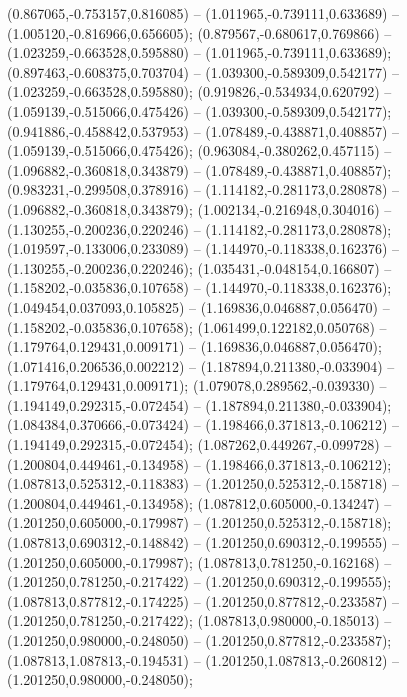  (0.867065,-0.753157,0.816085) -- (1.011965,-0.739111,0.633689) -- (1.005120,-0.816966,0.656605);
 (0.879567,-0.680617,0.769866) -- (1.023259,-0.663528,0.595880) -- (1.011965,-0.739111,0.633689);
 (0.897463,-0.608375,0.703704) -- (1.039300,-0.589309,0.542177) -- (1.023259,-0.663528,0.595880);
 (0.919826,-0.534934,0.620792) -- (1.059139,-0.515066,0.475426) -- (1.039300,-0.589309,0.542177);
 (0.941886,-0.458842,0.537953) -- (1.078489,-0.438871,0.408857) -- (1.059139,-0.515066,0.475426);
 (0.963084,-0.380262,0.457115) -- (1.096882,-0.360818,0.343879) -- (1.078489,-0.438871,0.408857);
 (0.983231,-0.299508,0.378916) -- (1.114182,-0.281173,0.280878) -- (1.096882,-0.360818,0.343879);
 (1.002134,-0.216948,0.304016) -- (1.130255,-0.200236,0.220246) -- (1.114182,-0.281173,0.280878);
 (1.019597,-0.133006,0.233089) -- (1.144970,-0.118338,0.162376) -- (1.130255,-0.200236,0.220246);
 (1.035431,-0.048154,0.166807) -- (1.158202,-0.035836,0.107658) -- (1.144970,-0.118338,0.162376);
 (1.049454,0.037093,0.105825) -- (1.169836,0.046887,0.056470) -- (1.158202,-0.035836,0.107658);
 (1.061499,0.122182,0.050768) -- (1.179764,0.129431,0.009171) -- (1.169836,0.046887,0.056470);
 (1.071416,0.206536,0.002212) -- (1.187894,0.211380,-0.033904) -- (1.179764,0.129431,0.009171);
 (1.079078,0.289562,-0.039330) -- (1.194149,0.292315,-0.072454) -- (1.187894,0.211380,-0.033904);
 (1.084384,0.370666,-0.073424) -- (1.198466,0.371813,-0.106212) -- (1.194149,0.292315,-0.072454);
 (1.087262,0.449267,-0.099728) -- (1.200804,0.449461,-0.134958) -- (1.198466,0.371813,-0.106212);
 (1.087813,0.525312,-0.118383) -- (1.201250,0.525312,-0.158718) -- (1.200804,0.449461,-0.134958);
 (1.087812,0.605000,-0.134247) -- (1.201250,0.605000,-0.179987) -- (1.201250,0.525312,-0.158718);
 (1.087813,0.690312,-0.148842) -- (1.201250,0.690312,-0.199555) -- (1.201250,0.605000,-0.179987);
 (1.087813,0.781250,-0.162168) -- (1.201250,0.781250,-0.217422) -- (1.201250,0.690312,-0.199555);
 (1.087813,0.877812,-0.174225) -- (1.201250,0.877812,-0.233587) -- (1.201250,0.781250,-0.217422);
 (1.087813,0.980000,-0.185013) -- (1.201250,0.980000,-0.248050) -- (1.201250,0.877812,-0.233587);
 (1.087813,1.087813,-0.194531) -- (1.201250,1.087813,-0.260812) -- (1.201250,0.980000,-0.248050);
